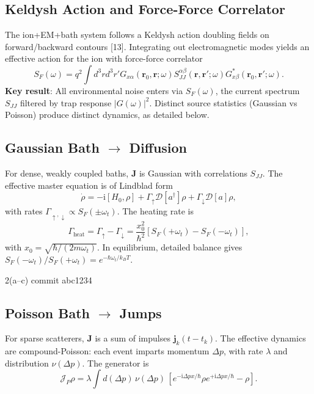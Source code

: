 \subsection{Keldysh Action and Force-Force Correlator}
The ion+EM+bath system follows a Keldysh action doubling fields on forward/backward contours [13]. Integrating out electromagnetic modes yields an effective action for the ion with force-force correlator
\begin{equation}
S_F(\omega) = q^2 \int d^3r d^3r' G_{x\alpha}(\mathbf{r}_0, \mathbf{r}; \omega) S^{\alpha\beta}_{JJ}(\mathbf{r}, \mathbf{r}'; \omega) G^*_{x\beta}(\mathbf{r}_0, \mathbf{r}'; \omega).
\end{equation}
\textbf{Key result}: All environmental noise enters via $S_F(\omega)$, the current spectrum $S_{JJ}$ filtered by trap response $|G(\omega)|^2$. Distinct source statistics (Gaussian vs Poisson) produce distinct dynamics, as detailed below.

\subsection{Gaussian Bath $\to$ Diffusion}
For dense, weakly coupled baths, $\mathbf{J}$ is Gaussian with correlations $S_{JJ}$.
The effective master equation is of Lindblad form
\begin{equation}
\dot{\rho} = -\mathrm{i}[H_0,\rho] + \Gamma_\uparrow \mathcal{D}[a^\dagger]\rho + \Gamma_\downarrow \mathcal{D}[a]\rho,
\end{equation}
with rates $\Gamma_{\uparrow,\downarrow} \propto S_F(\pm\omega_t)$.
The heating rate is
\begin{equation}
\Gamma_{\text{heat}} = \Gamma_\uparrow - \Gamma_\downarrow = \frac{x_0^2}{\hbar^2}\left[S_F(+\omega_t) - S_F(-\omega_t)\right],
\end{equation}
with $x_0=\sqrt{\hbar/(2m\omega_t)}$.
In equilibrium, detailed balance gives $S_F(-\omega_t)/S_F(+\omega_t)=e^{-\hbar\omega_t/k_BT}$.


{2(a--c)}
{commit abc1234}

\subsection{Poisson Bath $\to$ Jumps}
For sparse scatterers, $\mathbf{J}$ is a sum of impulses $\mathbf{j}_k(t-t_k)$.
The effective dynamics are compound-Poisson: each event imparts momentum $\Delta p$, with rate $\lambda$ and distribution $\nu(\Delta p)$.
The generator is
\begin{equation}
\mathcal{J}_P\rho = \lambda \int d(\Delta p)\, \nu(\Delta p)\,\left[e^{-\mathrm{i}\Delta p x/\hbar}\rho e^{+\mathrm{i}\Delta p x/\hbar}-\rho\right].
\end{equation}

